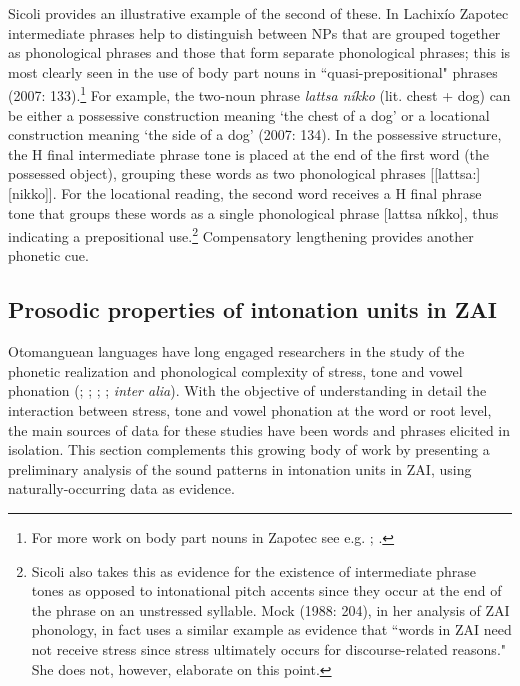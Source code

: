 Sicoli provides an illustrative example of the second of these. In Lachix\'{i}o Zapotec intermediate phrases help to distinguish between NPs that are grouped together as phonological phrases and those that form separate phonological phrases; this is most clearly seen in the use of body part nouns in ``quasi-prepositional" phrases (2007: 133).\footnote{For more work on body part nouns in Zapotec see e.g. \citet{maclaury1989}; \citet{lillehaugen2006}.} For example, the two-noun phrase \textit{lattsa n\'{i}kko} (lit. chest + dog) can be either a possessive construction meaning `the chest of a dog' or a locational construction meaning `the side of a dog' (2007: 134). In the possessive structure, the H final intermediate phrase tone is placed at the end of the first word (the possessed object), grouping these words as two phonological phrases [[lattsa:][nikko]]. For the locational reading, the second word receives a H final phrase tone that groups these words as a single phonological phrase [lattsa n\'{i}kko], thus indicating a prepositional use.\footnote{Sicoli also takes this as evidence for the existence of intermediate phrase tones as opposed to intonational pitch accents since they occur at the end of the phrase on an unstressed syllable. Mock (1988: 204), in her analysis of ZAI phonology, in fact uses a similar example as evidence that ``words in ZAI need not receive stress since stress ultimately occurs for discourse-related reasons." She does not, however, elaborate on this point.} Compensatory lengthening provides another phonetic cue. 


\subsection{Prosodic properties of intonation units in ZAI}\label{stressrule}

Otomanguean languages have long engaged researchers in the study of the phonetic realization and phonological complexity of stress, tone and vowel phonation (\citealt{arellanes2009}; \citealt{avelino2004}; \citealt{chavezpeon2010}; \citealt{mock1988}; \textit{inter alia}). With the objective of understanding in detail the interaction between stress, tone and vowel phonation at the word or root level, the main sources of data for these studies have been words and phrases elicited in isolation. This section complements this growing body of work by presenting a preliminary analysis of the sound patterns in intonation units in ZAI, using naturally-occurring data as evidence.

